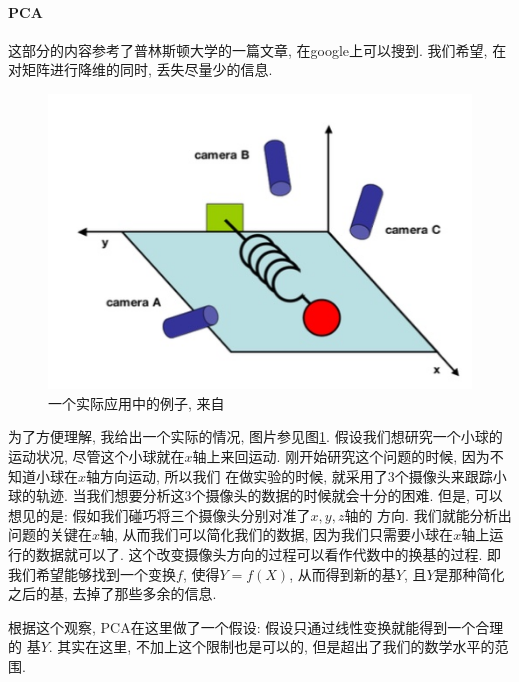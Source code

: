 \documentclass[fleqn,10pt]{SelfArx} %
\begin{document}
	\paragraph{PCA}
		这部分的内容参考了普林斯顿大学的一篇文章\cite{princetonPCA:25:2003}, 在google上可以搜到.
		我们希望, 在对矩阵进行降维的同时, 丢失尽量少的信息.
		\begin{figure}[ht] \centering
			\includegraphics[width=\linewidth]{example}
			\caption{一个实际应用中的例子, 来自\cite{princetonPCA:25:2003}}
			\label{fig:expample}
		\end{figure}
		为了方便理解, 我给出一个实际的情况, 图片参见图\ref{fig:expample}.
		假设我们想研究一个小球的运动状况, 尽管这个小球就在$x$轴上来回运动.
		刚开始研究这个问题的时候, 因为不知道小球在$x$轴方向运动, 所以我们
		在做实验的时候, 就采用了3个摄像头来跟踪小球的轨迹. 
		当我们想要分析这3个摄像头的数据的时候就会十分的困难.
		但是, 可以想见的是: 假如我们碰巧将三个摄像头分别对准了$x, y, z$轴的
		方向. 我们就能分析出问题的关键在$x$轴, 从而我们可以简化我们的数据, 
		因为我们只需要小球在$x$轴上运行的数据就可以了.
		这个改变摄像头方向的过程可以看作代数中的换基的过程.
		即我们希望能够找到一个变换$f$, 使得$Y = f(X)$, 从而得到新的基$Y$,
		且$Y$是那种简化之后的基, 去掉了那些多余的信息.
		
		根据这个观察, PCA在这里做了一个假设: 假设只通过线性变换就能得到一个合理的
		基$Y$. 其实在这里, 不加上这个限制也是可以的, 但是超出了我们的数学水平的范围.
\end{document}
